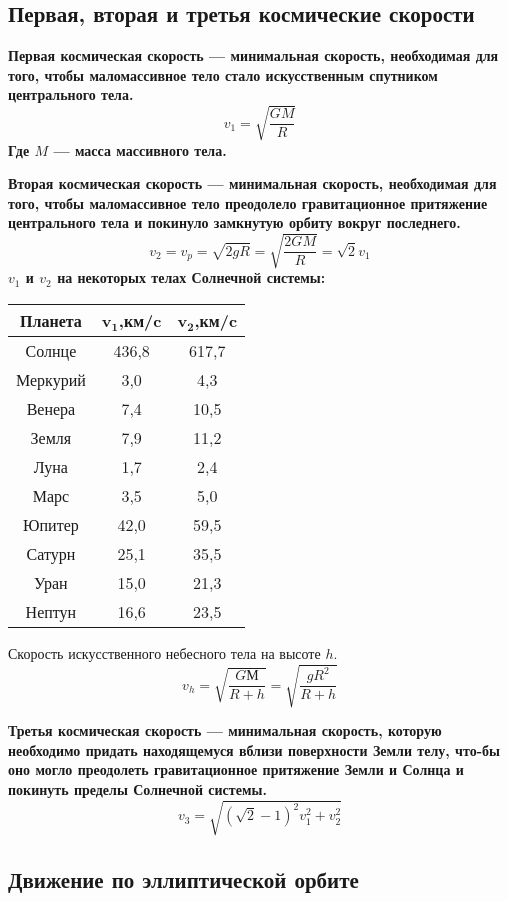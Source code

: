 \documentclass[10pt,a5paper]{article}
\begin{document}
\subsection{Первая, вторая и третья космические скорости} 

\bfseries Первая космическая скорость \mdseries --- минимальная скорость, необходимая для того, чтобы маломассивное тело стало искусственным спутником центрального тела.
$$v_1=\sqrt{\frac{GM}{R}}$$
Где $M$ --- масса массивного тела.

\bfseries Вторая космическая скорость \mdseries --- минимальная скорость, необходимая для того, чтобы маломассивное тело преодолело гравитационное притяжение центрального тела и покинуло замкнутую орбиту вокруг последнего. 
$$v_2=v_p=\sqrt{2gR}=\sqrt{\frac{2GM}{R}}=\sqrt{2}v_1$$
$v_1$ и $v_2$ на некоторых телах Солнечной системы:
\begin{table}[h!]
\centering
\begin{tabular}{|c|c|c|}
\hline
\textbf{Планета} & $\mathbf{v_1}$,\textbf{км/c} & $\mathbf{v_2}$,\textbf{км/c}\\
\hline
Солнце & 436,8 & 617,7\\
\hline
Меркурий & 3,0 & 4,3\\
\hline
Венера & 7,4 & 10,5\\
\hline
Земля & 7,9 & 11,2\\
\hline
Луна & 1,7 & 2,4\\
\hline
Марс & 3,5 & 5,0\\
\hline
Юпитер & 42,0 & 59,5\\
\hline
Сатурн & 25,1 & 35,5\\
\hline
Уран & 15,0 & 21,3\\
\hline
Нептун & 16,6 & 23,5\\
\hline
\end{tabular}
\end{table}

Скорость искусственного небесного тела на высоте $h$.$$v_h=\sqrt{\frac{GМ}{R+h}}=\sqrt{\frac{gR^2}{R+h}}$$

\bfseries Третья космическая скорость \mdseries --- минимальная скорость, которую необходимо придать находящемуся вблизи поверхности Земли телу, что-бы оно могло преодолеть гравитационное притяжение Земли и Солнца и покинуть пределы Солнечной системы.
$$v_3=\sqrt{(\sqrt{2}-1)^2v^2_1+v^2_2}$$ 
\subsection{Движение по эллиптической орбите}
\end{document}
